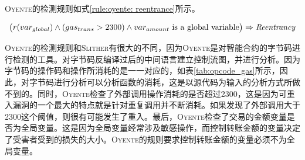 \textsc{Oyente}的检测规则如式\ref{rule:oyente: reentrance}所示。
\vspace{+3mm}
\begin{mdframed}[
	linewidth = 1pt,
	innertopmargin = -10pt,
	innerbottommargin = 3pt,
	outerlinewidth = 1pt
	]
    \small
	\begin{equation} \label{rule:oyente: reentrance}
    \big ( r(var_{global}) \wedge (gas_{trans} > 2300) \wedge var_{amount} \text{ is a global variable} \big )  \Rightarrow \text{\emph{Reentrancy}}
	\end{equation}
\end{mdframed}
\textsc{Oyente}的检测规则和\textsc{Slither}有很大的不同，因为\textsc{Oyente}是对智能合约的字节码进行检测的工具。对字节码反编译过后的中间语言建立控制流图，并进行分析。因为字节码的操作码和操作所消耗的是一一对应的，如表\ref{tab:opcode_gas}所示，因此，对字节码进行分析可以分析函数的消耗，这是以源代码为输入的分析方式所做不到的。同时，\textsc{Oyente}检查了外部调用操作消耗的是否超过2300，这是因为可重入漏洞的一个最大的特点就是针对重复调用并不断消耗。如果发现了外部调用大于2300这个阈值，则很有可能发生了重入。最后，\textsc{Oyente}检查了交易的金额变量是否为全局变量。这是因为全局变量经常涉及敏感操作，而控制转账金额的变量决定了受害者受到的损失的大小。\textsc{Oyente}的规则要求控制转账金额的变量必须不为全局变量。

